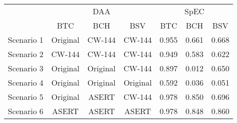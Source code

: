 
\begin{tabular}[t]{lcccccc}
\toprule
\multicolumn{1}{c}{ } & \multicolumn{3}{c}{DAA} & \multicolumn{3}{c}{SpEC} \\
\cmidrule(l{3pt}r{3pt}){2-4} \cmidrule(l{3pt}r{3pt}){5-7}
 & BTC & BCH & BSV & BTC & BCH & BSV\\
\midrule
Scenario 1 & Original & CW-144 & CW-144 & 0.955 & 0.661 & 0.668\\
Scenario 2 & CW-144 & CW-144 & CW-144 & 0.949 & 0.583 & 0.622\\
Scenario 3 & Original & Original & CW-144 & 0.897 & 0.012 & 0.650\\
Scenario 4 & Original & Original & Original & 0.592 & 0.036 & 0.051\\
Scenario 5 & Original & ASERT & CW-144 & 0.978 & 0.850 & 0.696\\
Scenario 6 & ASERT & ASERT & ASERT & 0.978 & 0.848 & 0.860\\
\bottomrule
\end{tabular}
